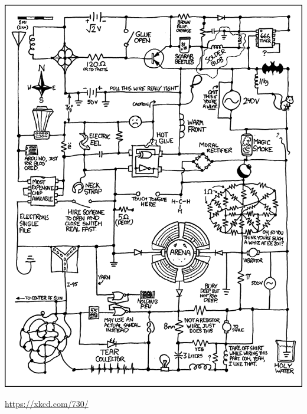 \documentclass[a4paper, french, 11pt]{article}  %
\begin{document}
\begin{center}
\includegraphics[scale=0.35]{images/circuit_diagram.png}

\url{https://xkcd.com/730/}
\end{center}



 
\end{document}
